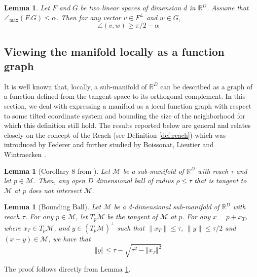 \documentclass[12pt]{article}
\newtheorem{Lemma}[Theorem]{Lemma}
\theoremstyle{remark}
\newcommand{\RR}{\mathbb{R}}
\newcommand{\MM}{\mathcal{M}}
\newcommand{\norm}[1]{\left\Vert #1 \right\Vert}
\newcommand{\maxangle}{\angle_{\max}}
\begin{document}
\begin{appendices}
\begin{Lemma}\label{lem:angle_space_perp_space}
Let $F$ and $G$ be two linear spaces of dimension $d$ in $\RR^D$. Assume that $\maxangle(F.G)\leq \alpha$. Then for any vector $v \in F^\perp$ and  $w\in G$,
\[
\angle(v,w) \geq \pi/2 - \alpha
\]
\end{Lemma}

\subsection{Viewing the manifold locally as a function graph}
It is well known that, locally, a sub-manifold of $\RR^D$ can be described as a graph of a function defined from the tangent space to its orthogonal complement.
In this section, we deal with expressing a manifold as a local function graph with respect to some tilted coordinate system and bounding the size of the neighborhood for which this definition still hold.
The results reported below are general and relates closely on the concept of the Reach (see Definition \ref{def:reach}) which was introduced by Federer \cite{federer1959curvature} and further studied by Boissonat, Lieutier and Wintraecken \cite{boissonnat2017reach}. 

\begin{Lemma}[Corollary 8 from \cite{boissonnat2017reach}] \label{lem:reach_ball_no_intersect_clean}
    Let $\MM$ be a sub-manifold of $\RR^D$ with reach $\tau$ and let $p\in\MM$.
    Then, any open $D$ dimensional ball of radius $\rho \leq \tau$ that is tangent to $\MM$ at $p$ does not intersect $\MM$.
\end{Lemma}




\begin{Lemma}[Bounding Ball]\label{lem:f_bound_circle_no_func_clean}
Let $\MM$ be a $d$-dimensional sub-manifold of $\RR^D$ with reach $\tau$. For any $p \in \MM$, let $T_{p}\MM$ be the tangent of $\MM$ at $p$.
    For any $x = p + x_T$, where $x_T\in T_p\MM$, and $y\in (T_p\MM)^\perp$  such that $\|x_T\|\leq \tau$, $\|y\| \leq \tau/2$ and $(x + y)\in \MM$, we have that 
    \[
    \norm{y} \leq \tau-\sqrt{\tau^2-\norm{x_T}^2}
    \]
\end{Lemma}
The proof follows directly from Lemma \ref{lem:reach_ball_no_intersect_clean}.



\end{appendices}
\end{document}
